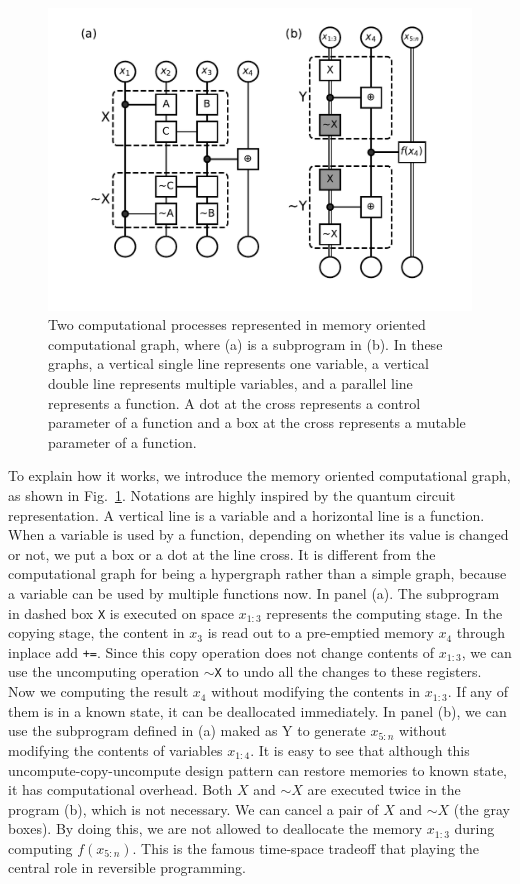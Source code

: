 \documentclass{article}
\newcommand{\<}{\langle}
\renewcommand{\>}{\rangle}
\newcommand{\Fig}[1]{Fig.~\ref{#1}}
\theoremstyle{definition}\newtheorem{definition}{\textit{Definition}}
\begin{document}
\begin{figure}
    \centerline{\includegraphics[width=0.6\columnwidth,trim={0 1cm 0 0cm},clip]{fig6.pdf}}
    \caption{Two computational processes represented in memory oriented computational graph, where (a) is a subprogram in (b). In these graphs, a vertical single line represents one variable, a vertical double line represents multiple variables, and a parallel line represents a function. A dot at the cross represents a control parameter of a function and a box at the cross represents a mutable parameter of a function.
    }\label{fig:ccu}
\end{figure}
To explain how it works, we introduce the memory oriented computational graph, as shown in \Fig{fig:ccu}.
Notations are highly inspired by the quantum circuit representation. A vertical line is a variable and a horizontal line is a function. When a variable is used by a function, depending on whether its value is changed or not, we put a box or a dot at the line cross. It is different from the computational graph for being a hypergraph rather than a simple graph, because a variable can be used by multiple functions now.
In panel (a). The subprogram in dashed box \texttt{X} is executed on space $x_{1\colon3}$ represents the computing stage. In the copying stage, the content in $x_3$ is read out to a pre-emptied memory $x_4$ through inplace add \texttt{+=}. Since this copy operation does not change contents of $x_{1\colon3}$, we can use the uncomputing operation \texttt{$\sim$X} to undo all the changes to these registers. Now we computing the result $x_4$ without modifying the contents in $x_{1\colon3}$. If any of them is in a known state, it can be deallocated immediately.
In panel (b), we can use the subprogram defined in (a) maked as Y to generate $x_{5\colon n}$ without modifying the contents of variables $x_{1\colon 4}$.
It is easy to see that although this uncompute-copy-uncompute design pattern can restore memories to known state, it has computational overhead.
Both $X$ and $\sim X$ are executed twice in the program (b), which is not necessary. We can cancel a pair of $X$ and $\sim X$ (the gray boxes). By doing this, we are not allowed to deallocate the memory $x_{1\colon3}$ during computing $f(x_{5\colon n})$. This is the famous time-space tradeoff that playing the central role in reversible programming.
\end{document}
